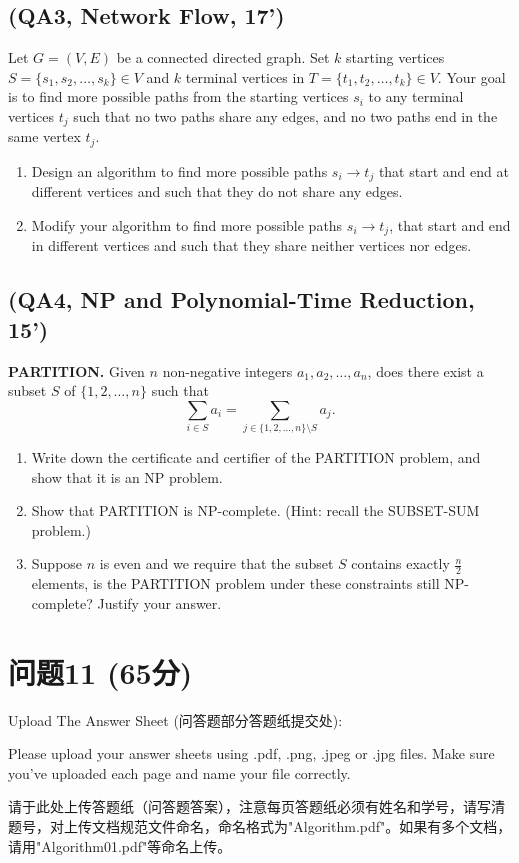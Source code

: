 \documentclass[11pt, a4paper]{article}
\begin{document}
\subsection*{(QA3, Network Flow, 17')}
Let \(G = (V,E)\) be a connected directed graph. Set \(k\) starting vertices \(S = \{s_1, s_2, \ldots, s_k\} \in V\) and \(k\) terminal vertices in \(T = \{t_1, t_2, \ldots, t_k\} \in V\). Your goal is to find more possible paths from the starting vertices \(s_i\) to any terminal vertices \(t_j\) such that no two paths share any edges, and no two paths end in the same vertex \(t_j\).

\begin{enumerate}[label=(\alph*), leftmargin=*]
    \item Design an algorithm to find more possible paths \(s_i \to t_j\) that start and end at different vertices and such that they do not share any edges.
    \item Modify your algorithm to find more possible paths \(s_i \to t_j\), that start and end in different vertices and such that they share neither vertices nor edges.
\end{enumerate}

\subsection*{(QA4, NP and Polynomial-Time Reduction, 15')}
\textbf{PARTITION.} Given \(n\) non-negative integers \(a_1, a_2, \ldots, a_n\), does there exist a subset \(S\) of \(\{1, 2, \ldots, n\}\) such that
\[ \sum_{i \in S} a_i = \sum_{j \in \{1, 2, \ldots, n\} \setminus S} a_j. \]

\begin{enumerate}[label=(\alph*), leftmargin=*]
    \item Write down the certificate and certifier of the PARTITION problem, and show that it is an NP problem.
    \item Show that PARTITION is NP-complete. (Hint: recall the SUBSET-SUM problem.)
    \item Suppose \(n\) is even and we require that the subset \(S\) contains exactly \(\frac{n}{2}\) elements, is the PARTITION problem under these constraints still NP-complete? Justify your answer.
\end{enumerate}

\section*{问题11 (65分)}
Upload The Answer Sheet (问答题部分答题纸提交处):

Please upload your answer sheets using .pdf, .png, .jpeg or .jpg files. Make sure you've uploaded each page and name your file correctly.

请于此处上传答题纸（问答题答案），注意每页答题纸必须有姓名和学号，请写清题号，对上传文档规范文件命名，命名格式为"Algorithm.pdf"。如果有多个文档，请用"Algorithm01.pdf"等命名上传。

\vspace{1cm}
\noindent
{}
\end{document}
